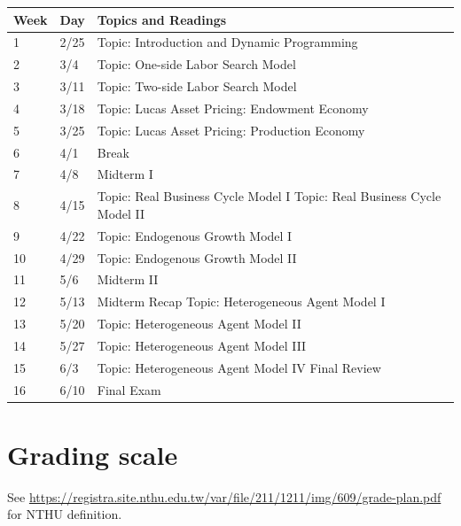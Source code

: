 \documentclass[12pt]{article}
\begin{document}
\newlength\bb
\setlength{}
\newlength\qq
\setlength{}
\newlength\rr
\setlength{}
\newlength\pp
\setlength{}
\begin{tabular}{|p{\bb}|p{\bb}|p{\pp}|}
    \hline
        Week & Day & Topics and Readings \\
    \hline
    \hline
        1
        &
        2/25
        &
        Topic: Introduction and Dynamic Programming
    \\
    \hline
        2
        &
        3/4
        &
        Topic: One-side Labor Search Model
    \\
    \hline

        3
        &
        3/11
        &
        Topic: Two-side Labor Search Model
    \\
    \hline
        4
        &
        3/18
        &
        Topic: Lucas Asset Pricing: Endowment Economy
    \\
    \hline
        5
        &
        3/25
        &
        Topic: Lucas Asset Pricing: Production Economy
    \\
    \hline
        6
        &
        4/1
        &
        Break
    \\
    \hline

        7
        &
        4/8
        &
        Midterm I
    \\
    \hline
        8
        &
        4/15
        &
        Topic: Real Business Cycle Model I
        Topic: Real Business Cycle Model II
    \\
    \hline
        9
        &
        4/22
        &
        Topic: Endogenous Growth Model I
    \\
    \hline
        10
        &
        4/29
        &
        Topic: Endogenous Growth Model II
    \\
    \hline
        11
        &
        5/6
        &
        Midterm II
    \\
    \hline
        12
        &
        5/13
        &
        Midterm Recap
        \newline
        Topic: Heterogeneous Agent Model I
    \\
    \hline
        13
        &
        5/20
        &
        Topic: Heterogeneous Agent Model II
    \\
    \hline
        14
        &
        5/27
        &
        Topic: Heterogeneous Agent Model III
    \\
    \hline
        15
        &
        6/3
        &
        Topic: Heterogeneous Agent Model IV
        \newline
        Final Review
    \\
    \hline
        16
        &
        6/10
        &
        Final Exam
    \\
    \hline
\end{tabular}

\section*{Grading scale}

See \url{https://registra.site.nthu.edu.tw/var/file/211/1211/img/609/grade-plan.pdf} for NTHU definition.
\end{document}
